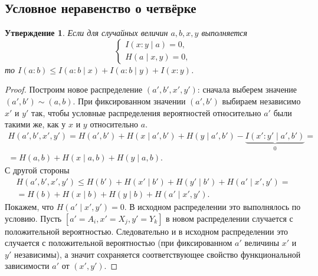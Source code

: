 \documentclass[12pt]{article}
\theoremstyle{definition}
\theoremstyle{plain}
\newtheorem{statement}{Утверждение}[section]
\theoremstyle{remark}
\begin{document}
\subsection{Условное неравенство о четвёрке}
\begin{statement}
    Если для случайных величин $a,b,x,y$ выполняется
    \[
        \begin{cases}
            I(x:y\mid a) = 0,\\
            H(a\mid x,y) = 0,
        \end{cases}
    \]
    то $I(a:b)\le I(a:b\mid x) + I(a:b\mid y) + I(x:y)$.
\end{statement}
\begin{proof}
    Построим новое распределение $(a',b',x',y')$:
    сначала выберем значение $(a',b')\sim (a,b)$.
    При фиксированном значении $(a',b')$ выбираем независимо $x'$ и $y'$ так,
    чтобы условные распределения вероятностей относительно $a'$ были такими же, как у $x$ и $y$ относительно $a$.
    \begin{multline*}
    H(a',b',x',y') = H(a',b') + H(x\mid a',b') + H(y\mid a',b') - \underbrace{I(x':y'\mid
    a',b')}_{0} =\\
    = H(a,b) + H(x\mid a,b) + H(y\mid a,b).
    \end{multline*}
    С другой стороны
    \begin{multline*}
    H(a',b',x',y') \le H(b') + H(x'\mid b') + H(y'\mid b') + H(a'\mid x',y') =\\
    = H(b) + H(x\mid b) + H(y\mid b) + H(a'\mid x', y').
    \end{multline*}
    Покажем, что $H(a'\mid x',y') = 0$. В исходном распределении это выполнялось по условию. 
    Пусть $[a' = A_i, x' = X_j, y' = Y_k]$ в новом распределении случается с положительной
    вероятностью. Следовательно и в исходном распределении это случается с положительной 
    вероятностью (при фиксированном $a'$ величины $x'$ и $y'$ независимы), 
    а значит сохраняется соответствующее свойство функциональной зависимости $a'$ от $(x',y')$.


\end{proof}
\end{document}
